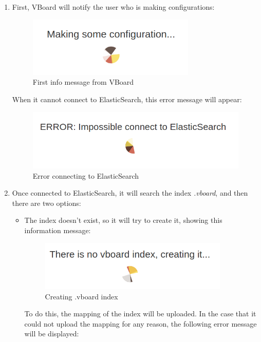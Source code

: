 \documentclass[a4paper, 12pt]{book}
\begin{document}
\begin{enumerate}

    \item First, VBoard will notify the user who is making configurations:
    \begin{figure}[H]
      \centering
      \includegraphics[width=8cm, keepaspectratio]{img/results/Init1}
      \caption{First info message from VBoard}
      \label{fig:onlynodes}
    \end{figure}
    When it cannot connect to ElasticSearch, this error message will appear:
    \begin{figure}[H]
      \centering
      \includegraphics[width=11cm, keepaspectratio]{img/results/Init2}
      \caption{Error connecting to ElasticSearch}
      \label{fig:onlynodes}
    \end{figure}
    \item Once connected to ElasticSearch, it will search the index \textit{.vboard}, and then there are two options:
    \begin{itemize}
        \item The index doesn't exist, so it will try to create it, showing this information message:
        \begin{figure}[H]
          \centering
          \includegraphics[width=9cm, keepaspectratio]{img/results/Init3}
          \caption{Creating .vboard index}
          \label{fig:onlynodes}
        \end{figure}
        To do this, the mapping of the index will be uploaded. In the case that it could not upload the mapping for any reason, the following error message will be displayed:

\end{itemize}
\end{enumerate}
\end{document}
